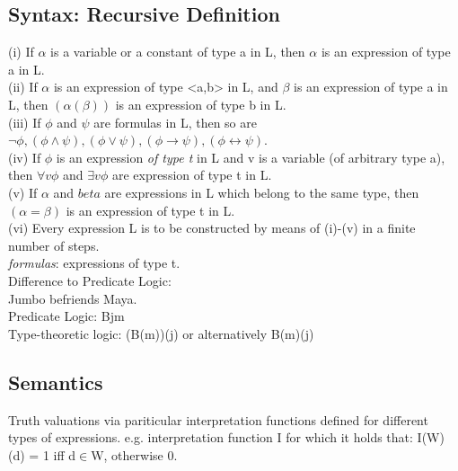 \subsection*{Syntax: Recursive Definition}
{\scriptsize (i) If $\alpha$ is a variable or a constant of type a in L, then $\alpha$ is an expression of type a in L.\\
(ii) If $\alpha$ is an expression of type <a,b> in L, and $\beta$ is an expression of type a in L, then $(\alpha (\beta))$ is an expression of type b in L.\\
(iii) If $\phi$ and $\psi$ are formulas in L, then so are $\neg \phi, (\phi \land \psi), (\phi \lor \psi), (\phi \to \psi), (\phi \leftrightarrow \psi)$.\\
(iv) If $\phi$ is an expression \emph{of type t} in L and v is a variable (of arbitrary type a), then $\forall v \phi$ and $\exists v \phi$ are expression of type t in L.\\
(v) If $\alpha$ and $beta$ are expressions in L which belong to the same type, then $(\alpha = \beta)$ is an expression of type t in L.\\
(vi) Every expression L is to be constructed by means of (i)-(v) in a finite number of steps.\\
\emph{formulas}: expressions of type t.} \\
{\tiny Difference to Predicate Logic: \\
Jumbo befriends Maya. \\
Predicate Logic: Bjm \\
Type-theoretic logic: (B(m))(j) or alternatively B(m)(j)}
\subsection*{Semantics}
{\tiny Truth valuations via pariticular interpretation functions defined for different types of expressions. e.g. interpretation function I for which it holds that: I(W)(d) = 1 iff d$\in$W, otherwise 0.}